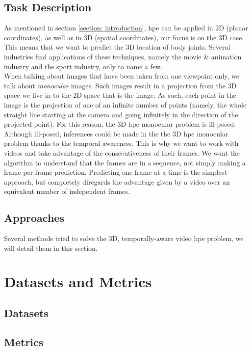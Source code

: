 \documentclass[runningheads]{llncs}
\begin{document}
\subsection{Task Description}
As mentioned in section \ref{section: introduction}, \ac{hpe} can be applied in 2D (planar coordinates), as well as in 3D (spatial coordinates), our focus is on the 3D case. This means that we want to predict the 3D location of body joints. Several industries find applications of these techniques, namely the movie \& animation industry and the sport industry, only to name a few. \\
When talking about images that have been taken from one viewpoint only, we talk about \textit{monocular} images. Such images result in a projection from the 3D space we live in to the 2D space that is the image. As such, each point in the image is the projection of one of an infinite number of points (namely, the whole straight line starting at the camera and going infinitely in the direction of the projected point). For this reason, the 3D \ac{hpe} monocular problem is ill-posed. \\
Although ill-posed, inferences could be made in the the 3D \ac{hpe} monocular problem thanks to the temporal awareness. This is why we want to work with videos and take advantage of the consecutiveness of their frames. We want the algorithm to understand that the frames are in a sequence, not simply making a frame-per-frame prediction. Predicting one frame at a time is the simplest approach, but completely diregards the advantage given by a video over an equivalent number of independent frames.

\subsection{Approaches}
Several methods tried to solve the 3D, temporally-aware video \ac{hpe} problem, we will detail them in this section.

\section{Datasets and Metrics}
\subsection{Datasets}
\subsection{Metrics}
\end{document}
